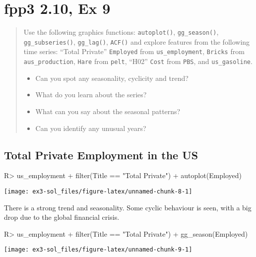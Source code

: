 \documentclass[
]{article}
\providecommand{\tightlist}{%
  \setlength{\itemsep}{0pt}\setlength{\parskip}{0pt}}
\begin{document}
\hypertarget{fpp3-2.10-ex-9}{%
\section{fpp3 2.10, Ex 9}\label{fpp3-2.10-ex-9}}

\begin{quote}
Use the following graphics functions: \texttt{autoplot()}, \texttt{gg\_season()}, \texttt{gg\_subseries()}, \texttt{gg\_lag()}, \texttt{ACF()} and explore features from the following time series: ``Total Private'' \texttt{Employed} from \texttt{us\_employment}, \texttt{Bricks} from \texttt{aus\_production}, \texttt{Hare} from \texttt{pelt}, ``H02'' \texttt{Cost} from \texttt{PBS}, and \texttt{us\_gasoline}.

\begin{itemize}
\tightlist
\item
  Can you spot any seasonality, cyclicity and trend?
\item
  What do you learn about the series?
\item
  What can you say about the seasonal patterns?
\item
  Can you identify any unusual years?
\end{itemize}
\end{quote}

\hypertarget{total-private-employment-in-the-us}{%
\subsection{Total Private Employment in the US}\label{total-private-employment-in-the-us}}

\begin{CodeChunk}
\begin{CodeInput}
R> us_employment %
+   filter(Title == "Total Private") %
+   autoplot(Employed)
\end{CodeInput}


\begin{center}\texttt{[image: ex3-sol\_files/figure-latex/unnamed-chunk-8-1]} \end{center}

\end{CodeChunk}

There is a strong trend and seasonality. Some cyclic behaviour is seen, with a big drop due to the global financial crisis.

\begin{CodeChunk}
\begin{CodeInput}
R> us_employment %
+   filter(Title == "Total Private") %
+   gg_season(Employed)
\end{CodeInput}


\begin{center}\texttt{[image: ex3-sol\_files/figure-latex/unnamed-chunk-9-1]} \end{center}

\end{CodeChunk}
\end{document}
